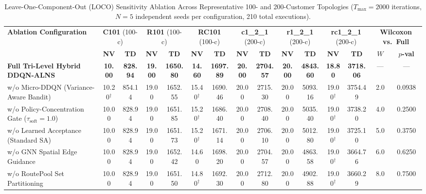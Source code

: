\documentclass{ieeeaccess}
\begin{document}
\begin{table}[!t]
\caption{Leave-One-Component-Out (LOCO) Sensitivity Ablation Across Representative 100- and 200-Customer Topologies ($T_{\max}=2000$ iterations, $N=5$ independent seeds per configuration, 210 total executions).}
\label{tab:loco_ablation_matrix}
\centering
\scriptsize
\setlength{\tabcolsep}{1.4pt}
\begin{tabular*}{\textwidth}{@{\extracolsep{\fill}} l cc cc cc cc cc cc cc @{}}
\toprule
\multirow{2}{*}{\textbf{Ablation Configuration}} & \multicolumn{2}{c}{\textbf{C101} (100-c)} & \multicolumn{2}{c}{\textbf{R101} (100-c)} & \multicolumn{2}{c}{\textbf{RC101} (100-c)} & \multicolumn{2}{c}{\textbf{c1\_2\_1} (200-c)} & \multicolumn{2}{c}{\textbf{r1\_2\_1} (200-c)} & \multicolumn{2}{c}{\textbf{rc1\_2\_1} (200-c)} & \multicolumn{2}{c}{\textbf{Wilcoxon vs.\ Full}} \\
\cmidrule(lr){2-3} \cmidrule(lr){4-5} \cmidrule(lr){6-7} \cmidrule(lr){8-9} \cmidrule(lr){10-11} \cmidrule(lr){12-13} \cmidrule(lr){14-15}
 & \textbf{NV} & \textbf{TD} & \textbf{NV} & \textbf{TD} & \textbf{NV} & \textbf{TD} & \textbf{NV} & \textbf{TD} & \textbf{NV} & \textbf{TD} & \textbf{NV} & \textbf{TD} & $W$ & $p$\textbf{-val} \\
\midrule
\textbf{Full Tri-Level Hybrid DDQN-ALNS} & \textbf{10.00} & \textbf{828.94} & \textbf{19.00} & \textbf{1650.80} & \textbf{14.60} & \textbf{1697.89} & \textbf{20.00} & \textbf{2704.57} & \textbf{20.00} & \textbf{4843.60} & \textbf{18.80} & \textbf{3718.06} & --- & --- \\
\midrule
w/o Micro-DDQN (Variance-Aware Bandit) & 10.20$^\dagger$ & 854.14 & 19.00 & 1652.55 & 15.40$^\dagger$ & 1690.46 & 20.00 & 2715.30 & 20.00 & 5093.16 & 19.00$^\dagger$ & 3754.49 & 2.0 & 0.0938 \\
w/o Policy-Concentration Gate ($\tau_{\text{soft}}=1.0$) & 10.00 & 828.94 & 19.00 & 1651.85 & 15.20$^\dagger$ & 1686.40 & 20.00 & 2708.40 & 20.00 & 5035.40 & 19.00$^\dagger$ & 3738.20 & 4.0 & 0.2500 \\
w/o Learned Acceptance (Standard SA) & 10.00 & 828.94 & 19.00 & 1651.73 & 15.20$^\dagger$ & 1671.14 & 20.00 & 2706.10 & 20.00 & 5012.80 & 19.00$^\dagger$ & 3725.10 & 5.0 & 0.3750 \\
w/o GNN Spatial Edge Guidance & 10.00 & 828.94 & 19.00 & 1652.42 & 14.60 & 1698.20 & 20.00 & 2704.57 & 20.00 & 4863.58 & 19.00$^\dagger$ & 3664.76 & 6.0 & 0.6250 \\
w/o RoutePool Set Partitioning & 10.00 & 828.94 & 19.00 & 1651.50 & 14.80$^\dagger$ & 1692.30 & 20.00 & 2712.80 & 20.00 & 4902.88 & 19.00$^\dagger$ & 3660.29 & 8.0 & 0.7500 \\

\end{tabular*}
\end{table}
\end{document}
